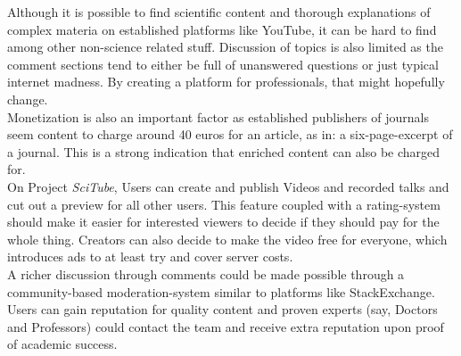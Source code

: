 
Although it is possible to find scientific content and thorough explanations
of complex materia on established platforms like YouTube, it can be
hard to find among other non-science related stuff. Discussion of topics 
is also limited as the comment sections tend to either be full of unanswered questions
or just typical internet madness. By creating a platform for professionals,
that might hopefully change.\\

Monetization is also an important factor as established publishers of journals
seem content to charge around 40 euros for an article, as in: a six-page-excerpt of a journal.
This is a strong indication that enriched content can also be charged for.\\
On Project \textit{SciTube}, Users can create and publish Videos and recorded 
talks and cut out a preview for all other
users. This feature coupled with a rating-system should make it easier 
for interested viewers to decide if they should pay for the whole thing.
Creators can also decide to make the video free for everyone, which 
introduces ads to at least try and cover server costs.\\
A richer discussion through comments could be made possible through a 
community-based moderation-system similar to platforms like StackExchange.
Users can gain reputation for quality content and proven experts
(say, Doctors and Professors) could contact the team and receive extra reputation
upon proof of academic success.


